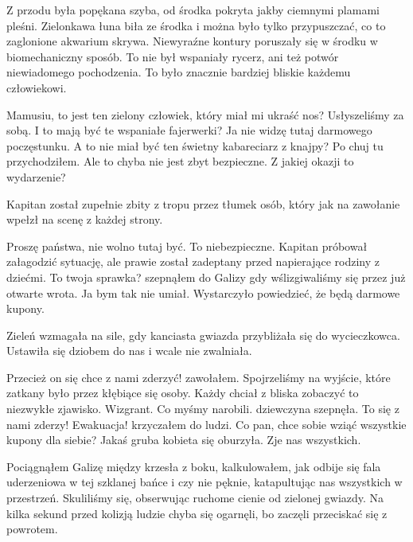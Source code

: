 Z przodu była popękana szyba, od środka pokryta jakby ciemnymi plamami pleśni.
Zielonkawa łuna biła ze środka i można było tylko przypuszczać, co to zaglonione akwarium skrywa.
Niewyraźne kontury poruszały się w środku w biomechaniczny sposób.
To nie był wspaniały rycerz, ani też potwór niewiadomego pochodzenia. 
To było znacznie bardziej bliskie każdemu człowiekowi.

\begin{dialogue}
	\ds{} Mamusiu, to jest ten zielony człowiek, który miał mi ukraść nos? \dm{} Usłyszeliśmy za sobą.
	\ds{} I to mają być te wspaniałe fajerwerki?
	\ds{} Ja nie widzę tutaj darmowego poczęstunku.
	\ds{} A to nie miał być ten świetny kabareciarz z knajpy?
	\ds{} Po chuj tu przychodziłem.
	\ds{} Ale to chyba nie jest zbyt bezpieczne.
	\ds{} Z jakiej okazji to wydarzenie?
\end{dialogue}

Kapitan został zupełnie zbity z tropu przez tłumek osób, który jak na zawołanie wpełzł na scenę z każdej strony.

\begin{dialogue}
	\dm{} Proszę państwa, nie wolno tutaj być. To niebezpieczne. \dm{} Kapitan próbował załagodzić sytuację, ale prawie został zadeptany przed napierające rodziny z dziećmi.
	\ds{} To twoja sprawka? \dm{} szepnąłem do Galizy gdy wślizgiwaliśmy się przez już otwarte wrota. \dm{} Ja bym tak nie umiał.
	\ds{} Wystarczyło powiedzieć, że będą darmowe kupony. 
\end{dialogue}

Zieleń wzmagała na sile, gdy kanciasta gwiazda przybliżała się do wycieczkowca.
Ustawiła się dziobem do nas i wcale nie zwalniała.

\begin{dialogue}
	\ds{} Przecież on się chce z nami zderzyć! \dm zawołałem. Spojrzeliśmy na wyjście, które zatkany było przez kłębiące się osoby. Każdy chciał z bliska zobaczyć to niezwykłe zjawisko.
	\ds{} Wizgrant. Co myśmy narobili. \dm{} dziewczyna szepnęła.
	\ds{} To się z nami zderzy! Ewakuacja! \dm{} krzyczałem do ludzi.
	\ds{} Co pan, chce sobie wziąć wszystkie kupony dla siebie? \dm{} Jakaś gruba kobieta się oburzyła.
	\ds{} Zje nas wszystkich.
\end{dialogue}

Pociągnąłem Galizę między krzesła z boku, kalkulowałem, jak odbije się fala uderzeniowa w tej szklanej bańce i czy nie pęknie, katapultując nas wszystkich w przestrzeń.
Skuliliśmy się, obserwując ruchome cienie od zielonej gwiazdy.
Na kilka sekund przed kolizją ludzie chyba się ogarnęli, bo zaczęli przeciskać się z powrotem.


